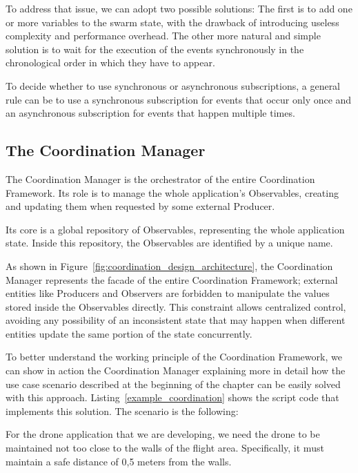 To address that issue, we can adopt two possible solutions:
The first is to add one or more variables to the swarm state, with the drawback of introducing useless complexity and performance overhead.
The other more natural and simple solution is to wait for the execution of the events synchronously in the chronological order in which they have to appear.

To decide whether to use synchronous or asynchronous subscriptions, a general rule can be to use a synchronous subscription for events that occur only once and an asynchronous subscription for events that happen multiple times.

\subsection{The Coordination Manager}\label{subsec:coordination_manager}

\begin{figure}[tb]
    \centering
    
\end{figure}

The Coordination Manager is the orchestrator of the entire Coordination Framework. 
Its role is to manage the whole application's Observables, creating and updating them when requested by some external Producer.

Its core is a global repository of Observables, representing the whole application state. 
Inside this repository, the Observables are identified by a unique name. 

As shown in Figure~\ref{fig:coordination_design_architecture}, the Coordination Manager represents the facade of the entire Coordination Framework; external entities like Producers and Observers are forbidden to manipulate the values stored inside the Observables directly.
This constraint allows centralized control, avoiding any possibility of an inconsistent state that may happen when different entities update the same portion of the state concurrently.

To better understand the working principle of the Coordination Framework, we can show in action the Coordination Manager explaining more in detail how the use case scenario described at the beginning of the chapter can be easily solved with this approach.
Listing~\ref{example_coordination} shows the script code that implements this solution. The scenario is the following:
\begin{displayquote}
    For the drone application that we are developing, we need the drone to be maintained not too close to the walls of the flight area. 
    Specifically, it must maintain a safe distance of 0,5 meters from the walls.
\end{displayquote}

